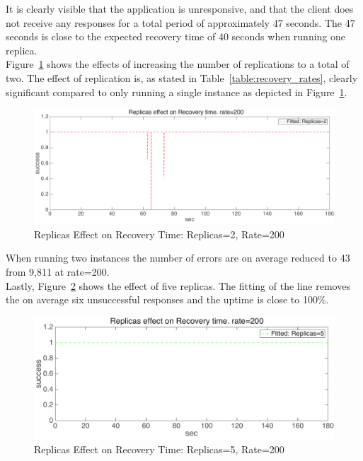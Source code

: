 \noindent 
It is clearly visible that the application is unresponsive, and that the client does not receive any responses for a total period of approximately 47 seconds. The 47 seconds is close to the expected recovery time of 40 seconds when running one replica.\\

\noindent Figure~\ref{fig:recovery_rep2} shows the effects of increasing the number of replications to a total of two. The effect of replication is, as stated in Table~\ref{table:recovery_rates}, clearly significant compared to only running a single instance as depicted in Figure~\ref{fig:recovery_rep2}.

\begin{figure}[H]
\centering
\includegraphics[width=12cm]{figures/recoverytime_rep2}
\caption{Replicas Effect on Recovery Time: Replicas=2, Rate=200}
\label{fig:recovery_rep2}
\end{figure}

\noindent
When running two instances the number of errors are on average reduced to 43 from 9,811 at rate=200. \\

\noindent
Lastly, Figure~\ref{fig:recovery_rep5} shows the effect of five replicas. The fitting of the line removes the on average six unsuccessful responses and the uptime is close to 100\%.
\begin{figure}[H]
\centering
\includegraphics[width=12cm]{figures/recoverytime_rep5}
\caption{Replicas Effect on Recovery Time: Replicas=5, Rate=200}
\label{fig:recovery_rep5}
\end{figure}


